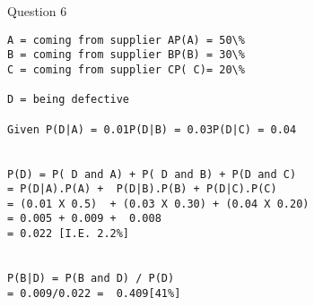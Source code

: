 Question 6

\begin{verbatim}
A = coming from supplier AP(A) = 50\%
B = coming from supplier BP(B) = 30\%
C = coming from supplier CP( C)= 20\%

D = being defective

Given P(D|A) = 0.01P(D|B) = 0.03P(D|C) = 0.04


P(D) = P( D and A) + P( D and B) + P(D and C)
= P(D|A).P(A) +  P(D|B).P(B) + P(D|C).P(C)
= (0.01 X 0.5)  + (0.03 X 0.30) + (0.04 X 0.20)
= 0.005 + 0.009 +  0.008
= 0.022 [I.E. 2.2%]


P(B|D) = P(B and D) / P(D)  
= 0.009/0.022 =  0.409[41%]
\end{verbatim}


